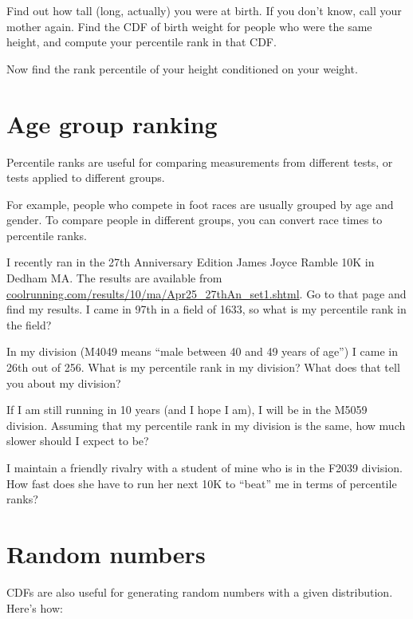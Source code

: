 \documentclass[10pt]{book}
\begin{document}
\begin{ex}
Find out how tall (long, actually) you were at birth.  If you don't
know, call your mother again.  Find the CDF of birth weight for
people who were the same height, and compute your percentile rank
in that CDF.

Now find the rank percentile of your height conditioned on your weight.
\end{ex}


\section{Age group ranking}

Percentile ranks are useful for comparing measurements from different
tests, or tests applied to different groups.

For example, people who compete in foot races are usually grouped by
age and gender.  To compare people in different groups, you can convert
race times to percentile ranks.

\begin{ex}

I recently ran in the 27th Anniversary Edition James Joyce Ramble 10K
in Dedham MA.  The results are available from
\url{coolrunning.com/results/10/ma/Apr25_27thAn_set1.shtml}.
Go to that page and find my results.  I came in 97th in a field
of 1633, so what is my percentile rank in the field?

In my division (M4049 means ``male between 40 and 49 years of age'')
I came in 26th out of 256.  What is my percentile rank in my division?
What does that tell you about my division?

If I am still running in 10 years (and I hope I am), I will be in
the M5059 division.  Assuming that my percentile rank in my division
is the same, how much slower should I expect to be?

I maintain a friendly rivalry with a student of mine who is in the
F2039 division.  How fast does she have to run her next 10K to
``beat'' me in terms of percentile ranks?

\end{ex}

\section{Random numbers}

CDFs are also useful for generating random numbers
with a given distribution.  Here's how:
\end{document}
